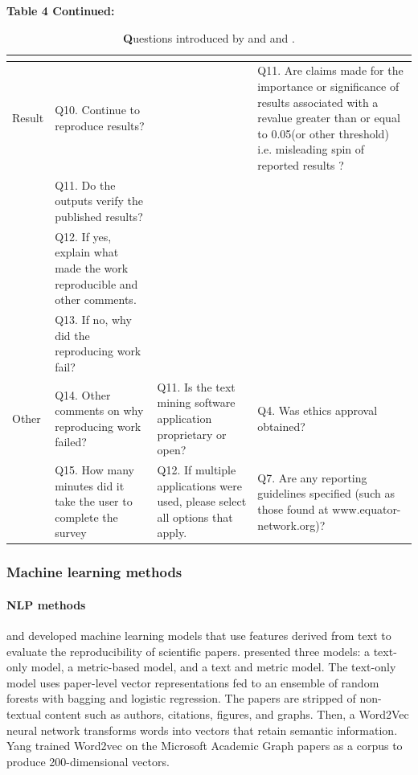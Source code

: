 \documentclass[12pt, a4paper, twocolumn]{article}
\newcommand{\subsubsubsection}[1]{\paragraph{#1}}
\begin{document}
	\begin{table}[]
	\centering
	\caption[]{\textbf Questions introduced by \citet{stagge2019assessing} and  \citet{mcintosh2017repeat} and \citet{QualityOutputChecklist}. }\label{tab:survey_table_3}{\textbf{Table 4 Continued:}}
	\begin{tabular}{>{\raggedright\arraybackslash}p{}>{\raggedright\arraybackslash}p{} >{\raggedright\arraybackslash}p{}>{\raggedright\arraybackslash}p{}}  
	\hline
&	\citet{stagge2019assessing}                                                                           & \citet{mcintosh2017repeat}        					 &\citet{QualityOutputChecklist}                   \\ 
\hline
Result 
&Q10. Continue to reproduce results?& &Q11. Are claims made for the importance or significance of results associated with a revalue greater than or equal to 0.05(or other threshold) i.e. misleading spin of reported results ? \\
&Q11. Do the outputs verify the published results? 		&&\\
&Q12. If yes, explain what made the work reproducible and other comments. 	&&\\
&Q13. If no, why did the reproducing work fail?&&\\
\hline
Other &Q14. Other comments on why reproducing work failed?         &Q11. Is the text mining software application proprietary or open?&Q4. Was ethics approval obtained?              \\     
&Q15. How many minutes did it take the user to complete the survey  &Q12. If multiple applications were used, please select all options that apply.    &Q7. Are any reporting guidelines specified (such as those found at www.equator-network.org)?     \\                  
\hline

	\end{tabular}
	\end{table}


		\subsubsection{Machine learning methods}\label{sec:ML_methods}

			\subsubsubsection{NLP methods}\label{sec:NLP_methods}
			
			 \citet{Yang2020estimating} and \citet{luo2020research} developed machine learning models that use features derived from text to evaluate the reproducibility of scientific papers. \citet{Yang2020estimating} presented three models: a text-only model, a metric-based model, and a text and metric model. The text-only model uses paper-level vector representations fed to an ensemble of random forests with bagging and logistic regression. The papers are stripped of non-textual content such as authors, citations, figures, and graphs. Then, a Word2Vec neural network transforms words into vectors that retain semantic information. Yang trained Word2vec on the Microsoft Academic Graph papers as a corpus to produce 200-dimensional vectors.
			
\end{document}
